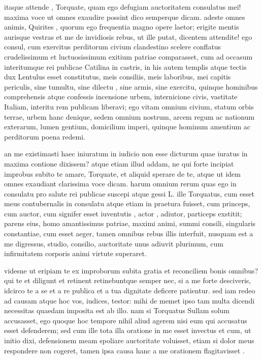  itaque attende , Torquate, quam ego defugiam auctoritatem consulatus mei! maxima voce ut omnes exaudire possint dico semperque dicam. adeste omnes animis, Quirites , quorum ego frequentia magno opere laetor; erigite mentis aurisque vestras et me de invidiosis rebus, ut ille putat, dicentem attendite! ego consul, cum exercitus perditorum civium clandestino scelere conflatus crudelissimum et luctuosissimum exitium patriae comparasset, cum ad occasum interitumque rei publicae Catilina in castris, in his autem templis atque tectis dux Lentulus esset constitutus, meis consiliis, meis laboribus, mei capitis periculis, sine tumultu, sine dilectu , sine armis, sine exercitu, quinque hominibus comprehensis atque confessis incensione urbem, internicione civis, vastitate Italiam, interitu rem publicam liberavi; ego vitam omnium civium, statum orbis terrae, urbem hanc denique, sedem omnium nostrum, arcem regum ac nationum exterarum, lumen gentium, domicilium imperi, quinque hominum amentium ac perditorum poena redemi.

 an me existimasti haec iniuratum in iudicio non esse dicturum quae iuratus in maxima contione dixissem? atque etiam illud addam, ne qui forte incipiat improbus subito te amare, Torquate, et aliquid sperare de te, atque ut idem omnes exaudiant clarissima voce dicam. harum omnium rerum quas ego in consulatu pro salute rei publicae suscepi atque gessi L. ille Torquatus, cum esset meus contubernalis in consulatu atque etiam in praetura fuisset, cum princeps, cum auctor, cum signifer esset iuventutis , actor , adiutor, particeps exstitit; parens eius, homo amantissimus patriae, maximi animi, summi consili, singularis constantiae, cum esset aeger, tamen omnibus rebus illis interfuit, nusquam est a me digressus, studio, consilio, auctoritate unus adiuvit plurimum, cum infirmitatem corporis animi virtute superaret.

 videsne ut eripiam te ex improborum subita gratia et reconciliem bonis omnibus? qui te et diligunt et retinent retinebuntque semper nec, si a me forte desciveris, idcirco te a se et a re publica et a tua dignitate deficere patientur. sed iam redeo ad causam atque hoc vos, iudices, testor: mihi de memet ipso tam multa dicendi necessitas quaedam imposita est ab illo. nam si Torquatus Sullam solum accusasset, ego quoque hoc tempore nihil aliud agerem nisi eum qui accusatus esset defenderem; sed cum ille tota illa oratione in me esset invectus et cum, ut initio dixi, defensionem meam spoliare auctoritate voluisset, etiam si dolor meus respondere non cogeret, tamen ipsa causa hanc a me orationem flagitavisset .

